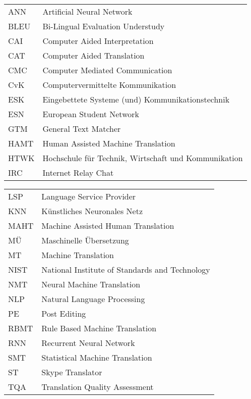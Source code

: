 \addchap{\lsAbbreviationsTitle}

\begin{tabularx}{.5\textwidth}[t]{@{}lQ}
{ANN} & {A}rtificial {N}eural {N}etwork \\
{BLEU} & {B}i-{L}ingual {E}valuation {U}nderstudy\\
{CAI} & {C}omputer {A}ided {I}nterpretation\\
{CAT} & {C}omputer {A}ided {T}ranslation\\
{CMC} & {C}omputer {M}ediated {C}ommunication\\
{CvK} & {C}omputer{v}ermittelte {K}ommunikation\\
{ESK} & {E}ingebettete {S}ysteme (und) {K}ommunikationstechnik\\
{ESN} & {E}uropean {S}tudent {N}etwork\\
{GTM} & {G}eneral {T}ext {M}atcher\\
{HAMT} & {H}uman {A}ssisted {M}achine {T}ranslation\\
{HTWK} & {H}ochschule für {T}echnik, {W}irtschaft und {K}ommunikation\\
{IRC} & {I}nternet {R}elay {C}hat\\
\end{tabularx}\begin{tabularx}{.5\textwidth}[t]{lQ@{}}
{LSP} & {L}anguage {S}ervice {P}rovider\\
{KNN} & {K}ünstliches {N}euronales {N}etz\\
{MAHT} & {M}achine {A}ssisted {H}uman {T}ranslation\\
{MÜ} & {M}aschinelle {Ü}bersetzung\\
{MT} & {M}achine {T}ranslation\\
{NIST} & {N}ational {I}nstitute of {S}tandards and {T}echnology\\
{NMT} & {N}eural {M}achine {T}ranslation\\
{NLP} & {N}atural {L}anguage {P}rocessing\\
{PE} & {P}ost {E}diting\\
{RBMT} & {R}ule {B}ased {M}achine {T}ranslation\\
{RNN} & {R}ecurrent {N}eural {N}etwork\\
{SMT} & {S}tatistical {M}achine {T}ranslation\\
{ST} & {S}kype {T}ranslator\\
{TQA} & {T}ranslation {Q}uality {A}ssessment\\
\end{tabularx}


